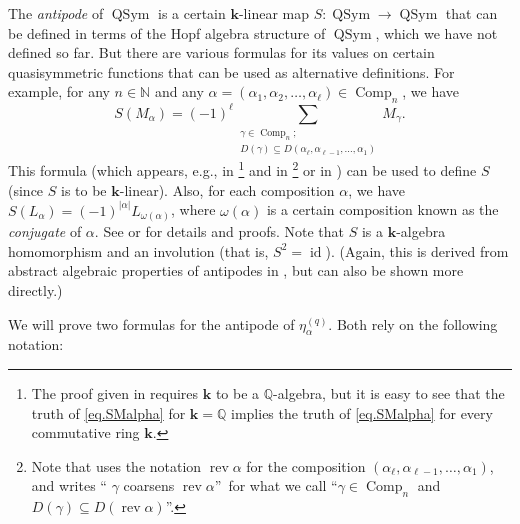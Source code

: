 \documentclass[numbers=enddot,12pt,final,onecolumn,notitlepage]{scrartcl}%
\theoremstyle{definition}
\let\sumnonlimits\sum
\renewcommand{\sum}{\sumnonlimits\limits}
\begin{document}
The \emph{antipode} of $\operatorname*{QSym}$ is a certain $\mathbf{k}$-linear
map $S:\operatorname*{QSym}\rightarrow\operatorname*{QSym}$ that can be
defined in terms of the Hopf algebra structure of $\operatorname*{QSym}$,
which we have not defined so far. But there are various formulas for its
values on certain quasisymmetric functions that can be used as alternative
definitions. For example, for any $n\in\mathbb{N}$ and any $\alpha=\left(
\alpha_{1},\alpha_{2},\ldots,\alpha_{\ell}\right)  \in\operatorname*{Comp}%
\nolimits_{n}$, we have%
\begin{equation}
S\left(  M_{\alpha}\right)  =\left(  -1\right)  ^{\ell}\sum_{\substack{\gamma
\in\operatorname*{Comp}\nolimits_{n};\\D\left(  \gamma\right)  \subseteq
D\left(  \alpha_{\ell},\alpha_{\ell-1},\ldots,\alpha_{1}\right)  }}M_{\gamma}.
\label{eq.SMalpha}%
\end{equation}
This formula (which appears, e.g., in \cite[(4.26)]{Malven93}\footnote{The
proof given in \cite{Malven93} requires $\mathbf{k}$ to be a $\mathbb{Q}%
$-algebra, but it is easy to see that the truth of \eqref{eq.SMalpha} for
$\mathbf{k} = \mathbb{Q}$ implies the truth of \eqref{eq.SMalpha} for every
commutative ring $\mathbf{k}$.} and in \cite[Theorem 5.1.11]{GriRei}%
\footnote{Note that \cite[Theorem 5.1.11]{GriRei} uses the notation
$\operatorname*{rev}\alpha$ for the composition $\left(  \alpha_{\ell}%
,\alpha_{\ell-1},\ldots,\alpha_{1}\right)  $, and writes \textquotedblleft%
$\gamma$ coarsens $\operatorname*{rev}\alpha$\textquotedblright\ for what we
call \textquotedblleft$\gamma\in\operatorname*{Comp}\nolimits_{n}$ and
$D\left(  \gamma\right)  \subseteq D\left(  \operatorname*{rev}\alpha\right)
$\textquotedblright.} or in \cite[detailed version, Proposition 10.70]%
{Grinbe15}) can be used to define $S$ (since $S$ is to be $\mathbf{k}%
$-linear). Also, for each composition $\alpha$, we have $S\left(  L_{\alpha
}\right)  =\left(  -1\right)  ^{\left\vert \alpha\right\vert }L_{\omega\left(
\alpha\right)  }$, where $\omega\left(  \alpha\right)  $ is a certain
composition known as the \emph{conjugate} of $\alpha$. See \cite[Corollaire
4.20]{Malven93} or \cite[Theorem 5.1.11 and Proposition 5.2.15]{GriRei} for
details and proofs. Note that $S$ is a $\mathbf{k}$-algebra homomorphism and
an involution (that is, $S^{2}=\operatorname*{id}$). (Again, this is derived
from abstract algebraic properties of antipodes in \cite{GriRei}, but can also
be shown more directly.)

We will prove two formulas for the antipode of $\eta_{\alpha}^{\left(
q\right)  }$. Both rely on the following notation:
\end{document}
